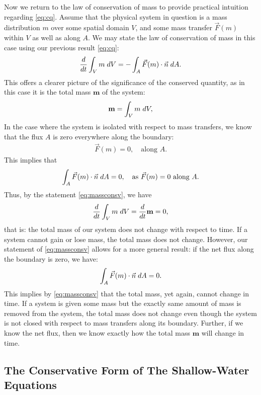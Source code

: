 \documentclass[../main.tex]{subfiles}
\begin{document}
\noindent Now we return to the law of conservation of mass to provide practical intuition regarding \ref{eq:cq}. Assume that the physical system in question is a mass distribution $m$ over some spatial domain $V$, and some mass transfer $\vec F(m)$ within $V$ as well as along $A$. We may state the law of conservation of mass in this case using our previous result \ref{eq:cq}:
\begin{gather}\label{eq:massconsv}
    \frac{d}{dt} \int_V m\hspace*{0.10 cm} dV = - \int_A \vec F(m) \cdot \vec n \hspace*{0.10 cm}dA.
\end{gather}
This offers a clearer picture of the significance of the conserved quantity, as in this case it is the total mass $\mathbf{m}$ of the system:
\begin{gather*}
    \mathbf{m} = \int_V m \hspace*{0.10 cm }dV,
\end{gather*}
In the case where the system is isolated with respect to mass transfers, we know that the flux $A$ is zero everywhere along the boundary:
\begin{gather*}
    \vec F(m) = 0,\quad\text{along } A.
\end{gather*}
This implies that
\begin{gather*}
    \int_A \vec F(m) \cdot \vec n \hspace*{0.10 cm}dA = 0,\quad\text{as } \vec F(m) = 0\text{ along } A.\\
\end{gather*}
Thus, by the statement \ref{eq:massconsv}, we have
\begin{gather*}
    \frac{d}{dt}\int_V m\hspace*{0.10 cm} dV = \frac{d}{dt}\mathbf{m} = 0,
\end{gather*}
that is: the total mass of our system does not change with respect to time. If a system cannot gain or lose mass, the total mass does not change. However, our statement of \ref{eq:massconsv} allows for a more general result: if the net flux along the boundary is zero, we have:
\begin{gather*}
    \int_A \vec F(m) \cdot \vec n \hspace*{0.10 cm}dA = 0.
\end{gather*}
This implies by \ref{eq:massconsv} that the total mass, yet again, cannot change in time. If a system is given some mass but the exactly same amount of mass is removed from the system, the total mass does not change even though the system is not closed with respect to mass transfers along its boundary. Further, if we know the net flux, then we know exactly how the total mass $\mathbf{m}$ will change in time.

\subsection{The Conservative Form of The Shallow-Water Equations}
\end{document}
